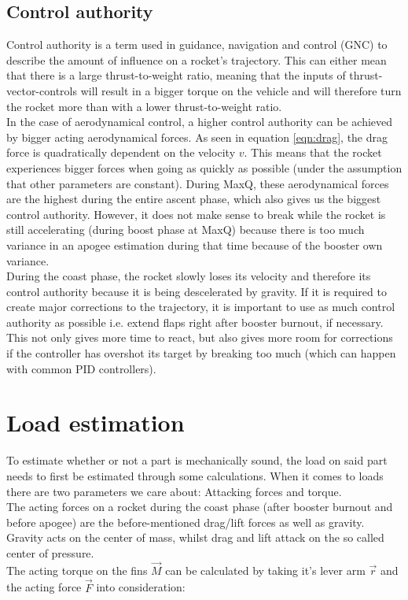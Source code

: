 \documentclass[fontsize=11pt,%
twoside,%
BCOR          = 8mm, %
DIV           = 11,  %
titlepage     = off,%
index=totoc,%
xcolor        = pdftex,%
dvipsnames,%
bibliography  = totoc,%
bibliography = numbered, %
listof        = notnumbered]{scrreprt}
\begin{document}
\subsection{Control authority}
Control authority is a term used in guidance, navigation and control (GNC) to describe the amount of influence on a rocket's trajectory. This can either mean that there is a large thrust-to-weight ratio, meaning that the inputs of thrust-vector-controls will result in a bigger torque on the vehicle and will therefore turn the rocket more than with a lower thrust-to-weight ratio.\\
In the case of aerodynamical control, a higher control authority can be achieved by bigger acting aerodynamical forces. As seen in equation \ref{eqn:drag}, the drag force is quadratically dependent on the velocity $v$. This means that the rocket experiences bigger forces when going as quickly as possible (under the assumption that other parameters are constant). During MaxQ, these aerodynamical forces are the highest during the entire ascent phase, which also gives us the biggest control authority. However, it does not make sense to break while the rocket is still accelerating (during boost phase at MaxQ) because there is too much variance in an apogee estimation during that time because of the booster own variance. \\
During the coast phase, the rocket slowly loses its velocity and therefore its control authority because it is being descelerated by gravity. If it is required to create major corrections to the trajectory, it is important to use as much control authority as possible i.e. extend flaps right after booster burnout, if necessary. This not only gives more time to react, but also gives more room for corrections if the controller has overshot its target by breaking too much (which can happen with common PID controllers).

\newpage

\section{Load estimation}
To estimate whether or not a part is mechanically sound, the load on said part needs to first be estimated through some calculations. When it comes to loads there are two parameters we care about: Attacking forces and torque.\\
The acting forces on a rocket during the coast phase (after booster burnout and before apogee) are the before-mentioned drag/lift forces as well as gravity. Gravity acts on the center of mass, whilst drag and lift attack on the so called center of pressure.\\
The acting torque on the fins $\vec{M}$ can be calculated by taking it's lever arm $\vec{r}$ and the acting force $\vec{F}$ into consideration:
\end{document}
